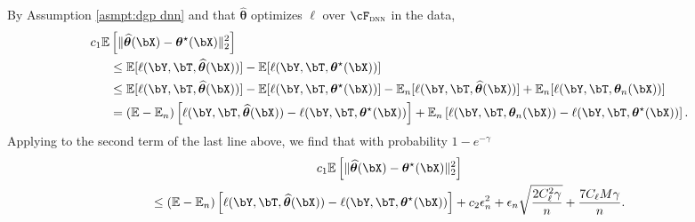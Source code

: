 \documentclass[12pt]{article}
\numberwithin{equation}{section}
\theoremstyle{definition}
\newcommand{\E}{\mathbb{E}}
\newcommand{\btheta}{\boldsymbol{\theta}}
\newcommand{\bttrue}{\btheta^\star}
\newcommand{\bthat}{\bm{\widehat{\theta}}}
\begin{document}
\begin{appendices}
By Assumption \ref{asmpt:dgp dnn} and that $\bthat$ optimizes $\ell$ over $\cF_{\textsc{dnn}}$ in the data,
\begin{align*}
	c_1 \E & \left[ \|\bthat(\bX) - \bttrue (\bX) \|_2^2 \right]   			 \\ 
	& \leq \E [\ell(\bY,\bT,\bthat(\bX))] - \E [\ell(\bY,\bT,\bttrue(\bX))]   			 \\
	& \leq \E [\ell(\bY,\bT,\bthat(\bX))] - \E [\ell(\bY,\bT,\bttrue(\bX))]   -   \E_n [\ell(\bY,\bT,\bthat(\bX))] + \E_n [\ell(\bY,\bT,\btheta_n(\bX))]  			 \\
	& = \left( \E - \E_n \right)\left[ \ell(\bY,\bT,\bthat(\bX)) - \ell(\bY,\bT,\bttrue(\bX)) \right] + \E_n \left[ \ell(\bY,\bT,\btheta_n(\bX)) - \ell(\bY,\bT,\bttrue(\bX)) \right].
\end{align*}
Applying \citet[Equation (A.2)]{Farrell-Liang-Misra2021_Ecma} to the second term of the last line above, we find that with probability $1-e^{-\gamma}$
\begin{multline}
    c_1 \E \left[ \|\bthat(\bX) - \bttrue (\bX) \|_2^2 \right] 
    \\
    \leq \left( \E - \E_n \right)\left[ \ell(\bY,\bT,\bthat(\bX)) - \ell(\bY,\bT,\bttrue(\bX)) \right] + c_2 \epsilon_n^2 + \epsilon_n \sqrt{\frac{2C_\ell^2 \gamma }{n}} + \frac{7 C_\ell M \gamma}{n}.
    \label{appxeqn:decomposition}
\end{multline}



\end{appendices}
\end{document}
